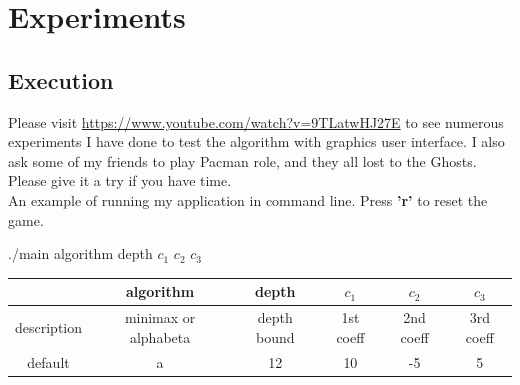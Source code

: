 \documentclass[a4paper, 11pt]{article}
\begin{document}
\section{Experiments}
\subsection{Execution}
Please visit \url{https://www.youtube.com/watch?v=9TLatwHJ27E} to see numerous experiments I have done to test the algorithm with graphics user interface. I also ask some of my friends to play Pacman role, and they all lost to the Ghosts. Please give it a try if you have time. \\
An example of running my application in command line. Press \textbf{'r'} to reset the game.
\begin{center} ./main algorithm depth $c_1$ $c_2$ $c_3$ \end{center}
\begin{table}[ht]
\centering
\begin{tabular}{|c|c|c|c|c|c|}
\hline
& algorithm & depth & $c_1$ & $c_2$ & $c_3$ \\ \hline
description & minimax or alphabeta & depth bound&1st coeff & 2nd coeff &3rd coeff \\ \hline
default & a & 12 & 10 & -5 & 5 \\
\hline
\end{tabular}
\end{table}
\end{document}
